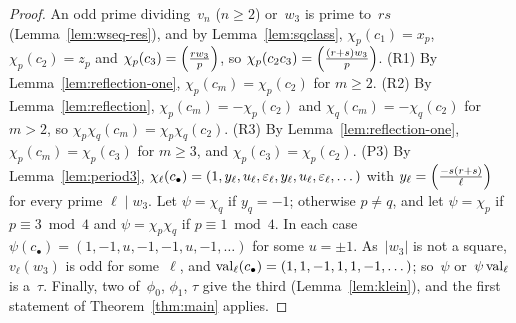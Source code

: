 \begin{proof}
  \leanok
  An odd prime dividing~$v_n$ ($n \ge 2$) or~$w_3$ is prime to~$rs$ (Lemma~\ref{lem:wseq-res}), and
  by Lemma~\ref{lem:sqclass}, $\chi_p(c_1) = x_p$, $\chi_p(c_2) = z_p$ and
  $\chi_p(c_3) = \left(\frac{r w_3}{p}\right)$, so $\chi_p(c_2 c_3) = \left(\frac{(r+s) w_3}{p}\right)$. (R1) By
  Lemma~\ref{lem:reflection-one}, $\chi_p(c_m) = \chi_p(c_2)$ for $m \ge 2$. (R2) By
  Lemma~\ref{lem:reflection}, $\chi_p(c_m) = -\chi_p(c_2)$ and $\chi_q(c_m) = -\chi_q(c_2)$ for
  $m > 2$, so $\chi_p\chi_q(c_m) = \chi_p\chi_q(c_2)$. (R3) By Lemma~\ref{lem:reflection-one},
  $\chi_p(c_m) = \chi_p(c_3)$ for $m \ge 3$, and $\chi_p(c_3) = \chi_p(c_2)$. (P3) By
  Lemma~\ref{lem:period3}, $\chi_\ell(c_\bullet) = (1, y_\ell, u_\ell, \varepsilon_\ell, y_\ell, u_\ell,
  \varepsilon_\ell, \dots)$ with $y_\ell = \left(\frac{-s(r+s)}{\ell}\right)$ for every prime $\ell \mid w_3$. Let
  $\psi = \chi_q$ if $y_q = -1$; otherwise $p \ne q$, and let $\psi = \chi_p$ if
  $p \equiv 3 \bmod 4$ and $\psi = \chi_p \chi_q$ if $p \equiv 1 \bmod 4$. In each case
  $\psi(c_\bullet) = (1, -1, u, -1, -1, u, -1, \dots)$ for some $u = \pm 1$. As~$|w_3|$ is not a
  square, $v_\ell(w_3)$ is odd for some~$\ell$, and $\operatorname{val}_\ell(c_\bullet) =
  (1, 1, -1, 1, 1, -1, \dots)$; so~$\psi$ or~$\psi \operatorname{val}_\ell$ is a~$\tau$. Finally, two
  of~$\phi_0$, $\phi_1$, $\tau$ give the third (Lemma~\ref{lem:klein}), and
  the first statement of Theorem~\ref{thm:main} applies.
\end{proof}

